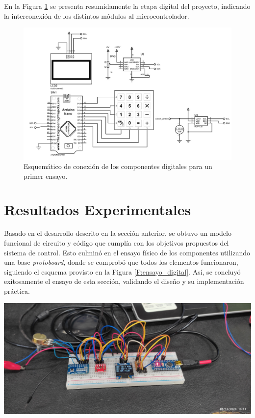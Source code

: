 En la Figura \ref{F:esquematico_proteus} se presenta resumidamente la etapa digital del proyecto, indicando la interconexión de los distintos módulos al microcontrolador.
\begin{figure}[H]
    \centering
    \includegraphics[width=\textwidth]{./imagenes/proteus_esquema2.jpg}
    \caption{Esquemático de conexión de los componentes digitales para un primer ensayo.}
    \label{F:esquematico_proteus}
\end{figure}

\section{Resultados Experimentales}
Basado en el desarrollo descrito en la sección anterior, se obtuvo un modelo funcional de circuito y código que cumplía con los objetivos propuestos del sistema de control. Esto culminó en el ensayo físico de los componentes utilizando una base \textit{protoboard}, donde se comprobó que todos los elementos funcionaron, siguiendo el esquema provisto en la Figura \ref{F:ensayo_digital}. Así, se concluyó exitosamente el ensayo de esta sección, validando el diseño y su implementación práctica.
\begin{foto}[H]
    \centering
    \includegraphics[scale=0.08]{./imagenes/ensayo_digital.jpg}
    \caption{Ensayo en \textit{protoboard} de los componentes correspondientes a la etapa digital.}
    \label{F:ensayo_digital}
\end{foto}

